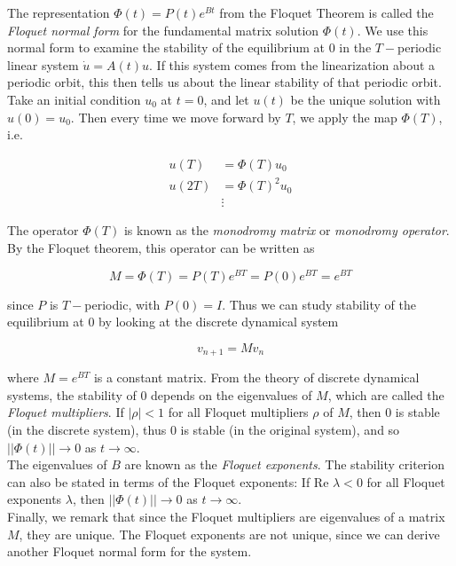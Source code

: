 \documentclass{article}
\begin{document}
The representation $\Phi(t) = P(t)e^{Bt}$ from the Floquet Theorem is called the \emph{Floquet normal form} for the fundamental matrix solution $\Phi(t)$. We use this normal form to examine the stability of the equilibrium at 0 in the $T-$periodic linear system $\dot{u} = A(t) u$. If this system comes from the linearization about a periodic orbit, this then tells us about the linear stability of that periodic orbit.\\

Take an initial condition $u_0$ at $t = 0$, and let $u(t)$ be the unique solution with $u(0) = u_0$. Then every time we move forward by $T$, we apply the map $\Phi(T)$, i.e.

\begin{align*}
u(T) &= \Phi(T) u_0 \\
u(2T) &= \Phi(T)^2 u_0 \\
&\vdots
\end{align*}

The operator $\Phi(T)$ is known as the \emph{monodromy matrix} or \emph{monodromy operator}. By the Floquet theorem, this operator can be written as

\[
M = \Phi(T) = P(T)e^{BT} = P(0) e^{BT} = e^{BT}
\]

since $P$ is $T-$periodic, with $P(0) = I$. Thus we can study stability of the equilibrium at 0 by looking at the discrete dynamical system

\[
v_{n+1} = M v_n
\]

where $M = e^{BT}$ is a constant matrix. From the theory of discrete dynamical systems, the stability of 0 depends on the eigenvalues of $M$, which are called the \emph{Floquet multipliers}. If $|\rho| < 1$ for all Floquet multipliers $\rho$ of $M$, then 0 is stable (in the discrete system), thus 0 is stable (in the original system), and so $||\Phi(t)|| \rightarrow 0$ as $t \rightarrow \infty$.\\

The eigenvalues of $B$ are known as the \emph{Floquet exponents}. The stability criterion can also be stated in terms of the Floquet exponents: If $\text{Re }\lambda < 0$ for all Floquet exponents $\lambda$, then $||\Phi(t)|| \rightarrow 0$ as $t \rightarrow \infty$.\\

Finally, we remark that since the Floquet multipliers are eigenvalues of a matrix $M$, they are unique. The Floquet exponents are not unique, since we can derive another Floquet normal form for the system.
\end{document}
